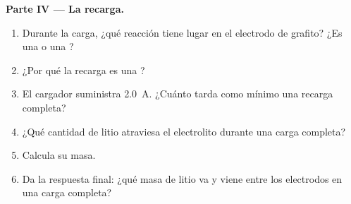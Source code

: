 \begin{problem}
\medskip
\noindent\textbf{Parte IV --- La recarga.}
\begin{enumerate}[resume]
  \item Durante la carga, ¿qué reacción tiene lugar en el electrodo de
        grafito? ¿Es una  o una ?
  \item ¿Por qué la recarga es una ?
  \item El cargador suministra \qty{2.0}{A}. ¿Cuánto tarda como mínimo una
        recarga completa?
  \item ¿Qué cantidad de  litio atraviesa el electrolito durante una
        carga completa?
  \item Calcula su masa.
  \item Da la respuesta final: ¿qué masa de litio va y viene entre los
        electrodos en una carga completa?
\end{enumerate}
\end{problem}
